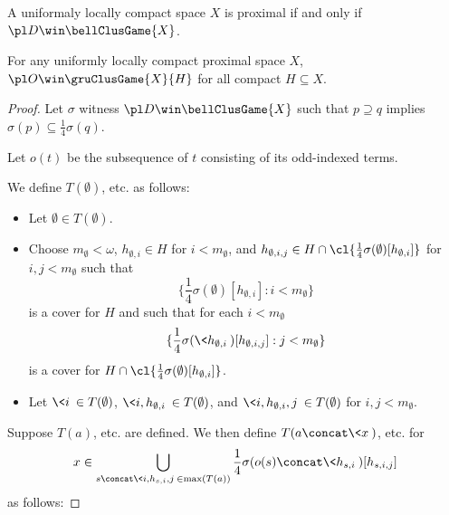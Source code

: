 \begin{cor}
  A uniformaly locally compact space $X$ is proximal if and only if $\pl D \win \bellClusGame{X}$.
\end{cor}

\begin{thm}
  For any uniformly locally compact proximal space $X$, $\pl O\win \gruClusGame{X}{H}$ for all compact $H\subseteq X$.
\end{thm}

\begin{proof}
  Let $\sigma$ witness $\pl D \win \bellClusGame{X}$ such that $p\supseteq q$ implies $\sigma(p)\subseteq \frac{1}{4}\sigma(q)$.

  Let $o(t)$ be the subsequence of $t$ consisting of its odd-indexed terms.

  We define $T(\emptyset)$, etc. as follows:

  \begin{itemize}
    \item Let $\emptyset\in T(\emptyset)$.
    \item Choose $m_\emptyset<\omega$, $h_{\emptyset,i}\in H$ for $i<m_\emptyset$, and $h_{\emptyset,i,j}\in H\cap\cl{\frac{1}{4}\sigma(\emptyset)[h_{\emptyset,i}]}$ for $i,j<m_\emptyset$ such that
      \[
        \{\frac{1}{4}\sigma(\emptyset)[h_{\emptyset,i}]:i<m_\emptyset\}
      \]
    is a cover for $H$ and such that for each $i<m_\emptyset$
      \[
        \{\frac{1}{4}\sigma(\<h_{\emptyset,i}\>)[h_{\emptyset,i,j}]:j<m_\emptyset\}
      \]
    is a cover for $H\cap\cl{\frac{1}{4}\sigma(\emptyset)[h_{\emptyset,i}]}$.
    \item Let $\<i\>\in T(\emptyset)$, $\<i,h_{\emptyset,i}\>\in T(\emptyset)$, and $\<i,h_{\emptyset,i},j\>\in T(\emptyset)$ for $i,j<m_\emptyset$.
  \end{itemize}

  Suppose $T(a)$, etc. are defined. We then define $T(a\concat\<x\>)$, etc. for
    \[
      x\in \bigcup_{s\concat\<i,h_{s,i},j\>\in\max(T(a))} \frac{1}{4}\sigma(o(s)\concat\<h_{s,i}\>)[h_{s,i,j}]
    \]
  as follows:


\end{proof}
